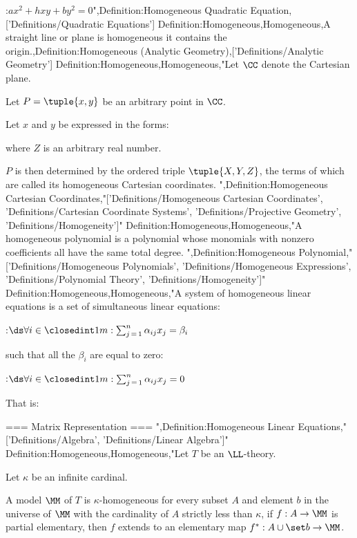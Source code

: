 :$a x^2 + h x y + b y^2 = 0$",Definition:Homogeneous Quadratic Equation,['Definitions/Quadratic Equations']
Definition:Homogeneous,Homogeneous,A straight line or plane is homogeneous  it contains the origin.,Definition:Homogeneous (Analytic Geometry),['Definitions/Analytic Geometry']
Definition:Homogeneous,Homogeneous,"Let $\CC$ denote the Cartesian plane.

Let $P = \tuple {x, y}$ be an arbitrary point in $\CC$.


Let $x$ and $y$ be expressed in the forms:






where $Z$ is an arbitrary real number.


$P$ is then determined by the ordered triple $\tuple {X, Y, Z}$, the terms of which are called its homogeneous Cartesian coordinates.
",Definition:Homogeneous Cartesian Coordinates,"['Definitions/Homogeneous Cartesian Coordinates', 'Definitions/Cartesian Coordinate Systems', 'Definitions/Projective Geometry', 'Definitions/Homogeneity']"
Definition:Homogeneous,Homogeneous,"A homogeneous polynomial is a polynomial whose monomials with nonzero coefficients all have the same total degree.
",Definition:Homogeneous Polynomial,"['Definitions/Homogeneous Polynomials', 'Definitions/Homogeneous Expressions', 'Definitions/Polynomial Theory', 'Definitions/Homogeneity']"
Definition:Homogeneous,Homogeneous,"A system of homogeneous linear equations is a set of simultaneous linear equations:

:$\ds \forall i \in \closedint 1 m: \sum_{j \mathop = 1}^n \alpha_{i j} x_j = \beta_i$

such that all the $\beta_i$ are equal to zero:

:$\ds \forall i \in \closedint 1 m : \sum_{j \mathop = 1}^n \alpha_{i j} x_j = 0$

That is:









=== Matrix Representation ===
",Definition:Homogeneous Linear Equations,"['Definitions/Algebra', 'Definitions/Linear Algebra']"
Definition:Homogeneous,Homogeneous,"Let $T$ be an $\LL$-theory.

Let $\kappa$ be an infinite cardinal.


A model $\MM$ of $T$ is $\kappa$-homogeneous  for every subset $A$ and element $b$ in the universe of $\MM$ with the cardinality of $A$ strictly less than $\kappa$, if $f: A \to \MM$ is partial elementary, then $f$ extends to an elementary map $f^*: A \cup \set b \to \MM$.

